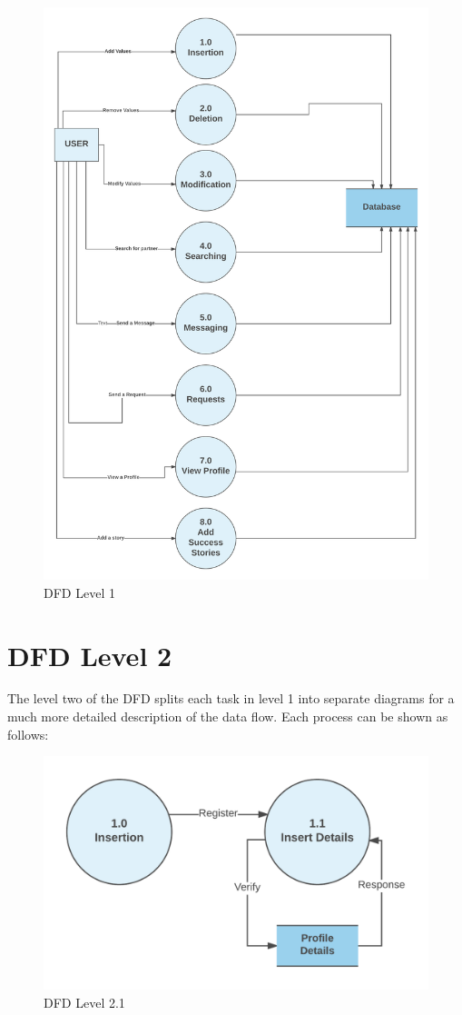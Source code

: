 \documentclass[12pt]{report}
\begin{document}
\begin{figure}[!htb]
    \centering
    \includegraphics[width=.7\textwidth]{df-l1.png}
    \caption{DFD Level 1}
    \label{fig:dfd l1}
\end{figure}



\section{DFD Level 2}
The level two of the DFD splits each task in level 1 into separate diagrams for a much more detailed description of the data flow. Each process can be shown as follows: 



\begin{figure}[!htb]
    \centering
    \includegraphics[width=.8\textwidth]{df-l2-1.png}
    \caption{DFD Level 2.1}
    \label{fig:dfd l2.1}
\end{figure}
\end{document}
